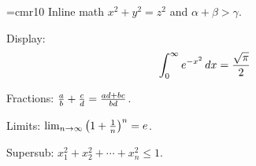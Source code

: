 \hsize 400pt
\parindent 0pt
\font\tenser=cmr10
\tenser
Inline math $x^2 + y^2 = z^2$ and $\alpha + \beta > \gamma$.
\par
Display: $$\int_0^\infty e^{-x^2}\,dx = {\sqrt{\pi} \over 2}$$
\par
Fractions: ${a \over b} + {c \over d} = {ad + bc \over bd}$.
\par
Limits: $\lim_{n \to \infty} \left(1 + {1 \over n}\right)^n = e$.
\par
Supersub: $x_1^2 + x_2^2 + \cdots + x_n^2 \leq 1$.
\par
\bye
